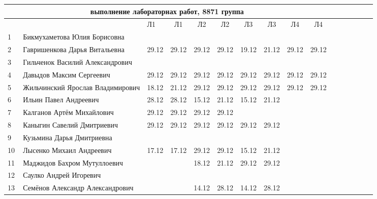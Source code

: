 \documentclass[a4paper,landscape,11pt]{article}
\begin{document}
\newpage
%
\begin{tabular}{l|llccccccccccccc}
\multicolumn{10}{c}{выполнение лабораторнах работ, 8871 группа} \\
\toprule
&&Л1&Л1& Л2&Л2& Л3&Л3& Л4&Л4&\\
\midrule
1\,& Бикмухаметова Юлия Борисовна     &\\
2\,& Гавришенкова Дарья Витальевна    & 29.12& 29.12& 29.12& 29.12& 19.12& 21.12& 29.12& 29.12\\
3\,& Гильченок Василий Александрович  &\\
4\,& Давыдов Максим Сергеевич         & 29.12& 29.12& 29.12& 29.12& 29.12& 29.12& 29.12& 29.12\\
5\,& Жильчинский Ярослав Владимирович & 18.12& 21.12& 29.12& 29.12& 29.12& 29.12& 29.12& 29.12\\
\midrule
6\,& Ильин Павел Андреевич            & 28.12& 28.12& 15.12& 21.12& 15.12& 21.12& \\
7\,&  Калганов Артём Михайлович       & 29.12& 29.12& 29.12& 29.12&\\
8\,& Каныгин Савелий Дмитриевич       & 29.12& 29.12& 29.12& 29.12& 29.12& 29.12\\
9\,&  Кузьмина Дарья Дмитриевна       &\\
10\,&  Лысенко Михаил Андреевич       &17.12& 17.12& 29.12& 29.12& 15.12& 21.12& \\
\midrule
11\,& Маджидов Бахром Мутуллоевич     &     &      & 18.12& 21.12& 29.12& 29.12\\
12\,&  Саулко Андрей Игоревич         &\\
13\,&  Семёнов Александр Александрович&     &      & 14.12& 28.12& 14.12& 28.12\\


\bottomrule
\end{tabular}
\end{document}
